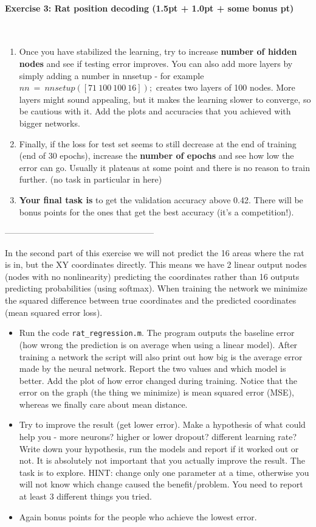 \documentclass[a4paper,11pt]{article}
\newenvironment{exercise}[3]{\paragraph{Exercise #1: #2 (#3pt)}\ \\}{
\medskip}
\begin{document}
\begin{exercise}{3}{Rat position decoding}{1.5pt + 1.0pt + some bonus }
\begin{enumerate}
    \item Once you have stabilized the learning, try to increase \textbf{number of hidden nodes} and see if testing error improves. You can also add more layers by simply adding a number in nnsetup - for example \texttt{$nn\ =\ nnsetup([71\ 100\ 100\ 16]);$}  creates two layers of 100 nodes. More layers might sound appealing, but it makes the learning slower to converge, so be cautious with it. Add the plots and accuracies that you achieved with bigger networks.
  \item Finally, if the loss for test set seems to still decrease at the end of training (end of 30 epochs), increase the \textbf{number of epochs} and see how low the error can go. Usually it plateaus at some point and there is no reason to train further. (no task in particular in here)
  \item \textbf{Your final task is} to get the validation accuracy above 0.42. There will be bonus points for the ones that get the best accuracy (it's a competition!).
\end{enumerate}

-----------------------------------------------------

In the second part of this exercise we will not predict the 16 areas where the rat is in, but the XY coordinates directly. This means we have 2 linear output nodes (nodes with no nonlinearity) predicting the coordinates rather than 16 outputs predicting probabilities (using softmax). When training the network we minimize the squared difference between true coordinates and the predicted coordinates (mean squared error loss).

\begin{itemize}
\item Run the code \texttt{rat\_regression.m}. The program outputs the baseline error (how wrong the prediction is on average when using a linear model). After training a network the script will also print out how big is the average error made by the neural network. Report the two values and which model is better. Add the plot of how error changed during training. Notice that the error on the graph (the thing we minimize) is mean squared error (MSE), whereas we finally care about mean distance.
\item Try to improve the result (get lower error). Make a hypothesis of what could help you - more neurons? higher or lower dropout? different learning rate? Write down your hypothesis, run the models and report if it worked out or not. It is absolutely not important that you actually improve the result. The task is to explore. HINT: change only one parameter at a time, otherwise you will not know which change caused the benefit/problem. You need to report at least 3 different things you tried.
\item Again bonus points for the people who achieve the lowest error.
\end{itemize}
\end{exercise}
\end{document}
